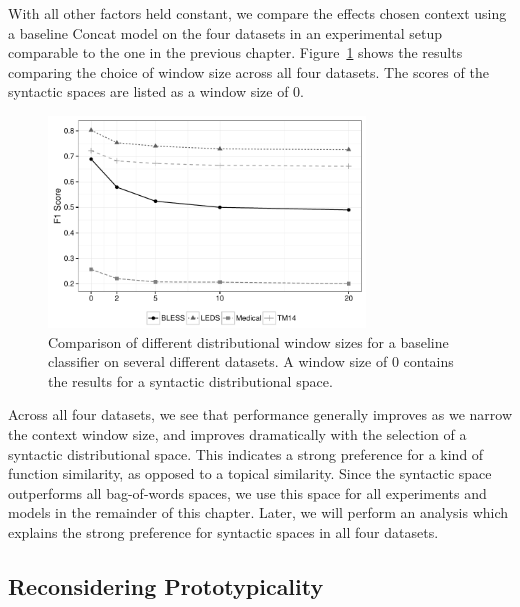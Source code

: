 With all other factors held constant, we compare the effects chosen context
using a baseline Concat model \cite{weeds:2014:coling} on the four datasets in
an experimental setup comparable to the one in the previous chapter.
Figure~\ref{fig:window} shows the results comparing the choice of window
size across all four datasets. The scores of the syntactic spaces are listed
as a window size of 0.

\begin{figure}
  \centering
  \includegraphics[width=0.75\textwidth]{plots/window.pdf}
  \caption{Comparison of different distributional window sizes for a baseline
  classifier on several different datasets. A window size of 0 contains the
  results for a syntactic distributional space.}
  \label{fig:window}
\end{figure}

Across all four datasets, we see that performance generally improves as
we narrow the context window size, and improves dramatically with the
selection of a syntactic distributional space. This indicates a strong
preference for a kind of function similarity, as opposed to a topical
similarity. Since the syntactic space outperforms all bag-of-words spaces,
we use this space for all experiments and models in the remainder of this
chapter. Later, we will perform an analysis which explains the strong
preference for syntactic spaces in all four datasets.

\subsection{Reconsidering Prototypicality}

